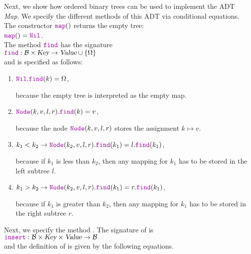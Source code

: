 Next, we show how ordered binary trees can be used to implement the ADT  \textsl{Map}.  We specify
the different methods of this ADT via conditional equations.  The constructor $\mytt{map}()$
returns the empty tree:
\\[0.2cm]
\hspace*{1.3cm}
$\mytt{map}() = \mytt{Nil}$. 
\\[0.2cm]
The  method $\mytt{find}$ has the signature 
\\[0.2cm]
\hspace*{1.3cm}
$\mytt{find}:\mathcal{B} \times \textsl{Key} \rightarrow \textsl{Value} \cup \{ \Omega \}$
\\[0.2cm]
and is specified as follows:
\begin{enumerate}
\item $\mytt{Nil}.\mytt{find}(k) = \Omega$,

      because the empty tree is interpreted as the empty map.
\item $\mytt{Node}(k, v, l, r).\mytt{find}(k) = v$,

      because the node $\mytt{Node}(k,v,l,r)$ stores the assignment $k \mapsto v$.
\item $k_1 < k_2 \rightarrow \mytt{Node}(k_2, v, l, r).\mytt{find}(k_1) = l.\mytt{find}(k_1)$,

      because if $k_1$ is less than $k_2$, then any mapping for $k_1$ has to be stored in the left
      subtree  $l$.
\item $k_1 > k_2 \rightarrow \mytt{Node}(k_2, v, l, r).\mytt{find}(k_1) = r.\mytt{find}(k_1)$,

      because if $k_1$ is greater than $k_2$, then any mapping for $k_1$ has to be stored in the right
      subtree  $r$.
\end{enumerate}
Next, we specify the method  .  The signature of  is
\\[0.2cm]
\hspace*{1.3cm}
$\mytt{insert}: \mathcal{B} \times \textsl{Key} \times \textsl{Value} \rightarrow \mathcal{B}$
\\[0.2cm]
and the definition of  is given by the following equations.

